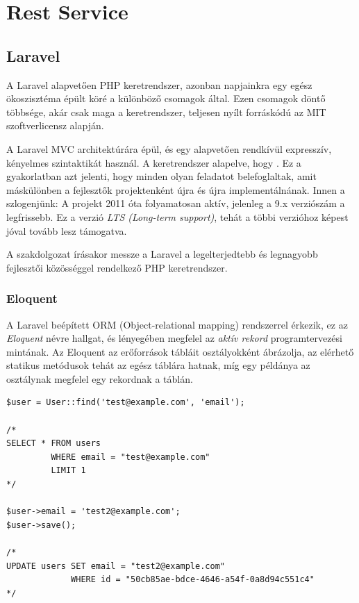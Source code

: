 \documentclass[a4paper,12pt]{thesis-ekf}
\theoremstyle{definition}
\begin{document}
	\chapter{Rest Service}

		\section{Laravel}
			A Laravel alapvetően PHP keretrendszer\cite{laravel-wiki}, azonban napjainkra egy egész ökoszisztéma épült köré a különböző csomagok által. Ezen csomagok döntő többsége, akár csak maga a keretrendszer, teljesen nyílt forráskódú az MIT szoftverlicensz alapján.
			
			A Laravel MVC architektúrára épül, és egy alapvetően rendkívül expresszív, kényelmes szintaktikát használ. A keretrendszer alapelve, hogy . Ez a gyakorlatban azt jelenti, hogy minden olyan feladatot belefoglaltak, amit máskülönben a fejlesztők projektenként újra és újra implementálnának. Innen a szlogenjünk:  A projekt 2011 óta folyamatosan aktív, jelenleg a 9.x verziószám a legfrissebb. Ez a verzió \emph{LTS (Long-term support)}, tehát a többi verzióhoz képest jóval tovább lesz támogatva.\cite{laravel-wiki}
			
			A szakdolgozat írásakor messze a Laravel a legelterjedtebb és legnagyobb fejlesztői közösséggel rendelkező PHP keretrendszer.\cite{framework-comp}
			
			\subsection{Eloquent}\label{sc:eloquent}
				A Laravel beépített ORM (Object-relational mapping) rendszerrel érkezik, ez az \emph{Eloquent} névre hallgat, és lényegében megfelel az \emph{aktív rekord} programtervezési mintának. Az Eloquent az erőforrások tábláit osztályokként ábrázolja, az elérhető statikus metódusok tehát az egész táblára hatnak, míg egy példánya az osztálynak megfelel egy rekordnak a táblán.\cite{laravel-eloquent}
				
				\pagebreak
				
				\begin{lstlisting}[caption={Eloquent \'es az SQL kapcsolata},captionpos=b]
$user = User::find('test@example.com', 'email'); 

/* 
SELECT * FROM users 
         WHERE email = "test@example.com" 
         LIMIT 1 
*/

$user->email = 'test2@example.com';
$user->save();

/*
UPDATE users SET email = "test2@example.com"
             WHERE id = "50cb85ae-bdce-4646-a54f-0a8d94c551c4"
*/
				\end{lstlisting}
				
\end{document}

